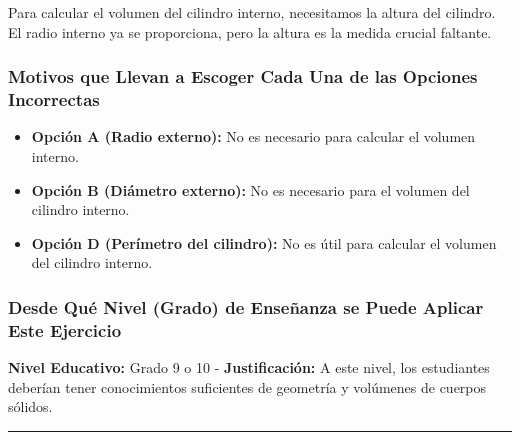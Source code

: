 \documentclass[
]{article}
\providecommand{\tightlist}{%
  \setlength{\itemsep}{0pt}\setlength{\parskip}{0pt}}
\begin{document}
Para calcular el volumen del cilindro interno, necesitamos la altura del
cilindro. El radio interno ya se proporciona, pero la altura es la
medida crucial faltante.

\subsubsection{Motivos que Llevan a Escoger Cada Una de las Opciones
Incorrectas}\label{motivos-que-llevan-a-escoger-cada-una-de-las-opciones-incorrectas}

\begin{itemize}
\tightlist
\item
  \textbf{Opción A (Radio externo):} No es necesario para calcular el
  volumen interno.
\item
  \textbf{Opción B (Diámetro externo):} No es necesario para el volumen
  del cilindro interno.
\item
  \textbf{Opción D (Perímetro del cilindro):} No es útil para calcular
  el volumen del cilindro interno.
\end{itemize}

\subsubsection{Desde Qué Nivel (Grado) de Enseñanza se Puede Aplicar
Este
Ejercicio}\label{desde-quuxe9-nivel-grado-de-enseuxf1anza-se-puede-aplicar-este-ejercicio}

\textbf{Nivel Educativo:} Grado 9 o 10 - \textbf{Justificación:} A este
nivel, los estudiantes deberían tener conocimientos suficientes de
geometría y volúmenes de cuerpos sólidos.

\begin{center}\rule{0.5\linewidth}{0.5pt}\end{center}
\end{document}
